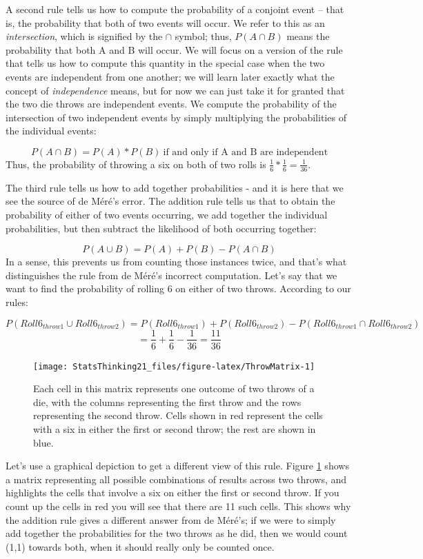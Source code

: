 \documentclass[12pt,]{book}
\theoremstyle{definition}
\theoremstyle{definition}
\theoremstyle{definition}
\theoremstyle{remark}
\begin{document}
A second rule tells us how to compute the probability of a conjoint event -- that is, the probability that both of two events will occur. We refer to this as an \emph{intersection}, which is signified by the \(\cap\) symbol; thus, \(P(A \cap B)\) means the probability that both A and B will occur. We will focus on a version of the rule that tells us how to compute this quantity in the special case when the two events are independent from one another; we will learn later exactly what the concept of \emph{independence} means, but for now we can just take it for granted that the two die throws are independent events. We compute the probability of the intersection of two independent events by simply multiplying the probabilities of the individual events:

\[
P(A \cap B) = P(A) * P(B)\ \text{if and only if A and B are independent}
\]
Thus, the probability of throwing a six on both of two rolls is \(\frac{1}{6}*\frac{1}{6}=\frac{1}{36}\).

The third rule tells us how to add together probabilities - and it is here that we see the source of de Méré's error. The addition rule tells us that to obtain the probability of either of two events occurring, we add together the individual probabilities, but then subtract the likelihood of both occurring together:

\[
P(A \cup B) = P(A) + P(B) - P(A \cap B)
\]
In a sense, this prevents us from counting those instances twice, and that's what distinguishes the rule from de Méré's incorrect computation. Let's say that we want to find the probability of rolling 6 on either of two throws. According to our rules:

\[
P(Roll6_{throw1} \cup Roll6_{throw2}) = P(Roll6_{throw1}) + P(Roll6_{throw2}) - P(Roll6_{throw1} \cap Roll6_{throw2}) 
\]
\[
= \frac{1}{6} + \frac{1}{6} - \frac{1}{36} = \frac{11}{36}
\]

\begin{figure}
\texttt{[image: StatsThinking21\_files/figure-latex/ThrowMatrix-1]} \caption{Each cell in this matrix represents one outcome of two throws of a die, with the columns representing the first throw and the rows representing the second throw. Cells shown in red represent the cells with a six in either the first or second throw; the rest are shown in blue.}\label{fig:ThrowMatrix}
\end{figure}

Let's use a graphical depiction to get a different view of this rule. Figure \ref{fig:ThrowMatrix} shows a matrix representing all possible combinations of results across two throws, and highlights the cells that involve a six on either the first or second throw. If you count up the cells in red you will see that there are 11 such cells. This shows why the addition rule gives a different answer from de Méré's; if we were to simply add together the probabilities for the two throws as he did, then we would count (1,1) towards both, when it should really only be counted once.
\end{document}
